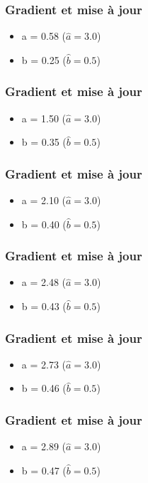 \documentclass{formation}
\begin{document}
\begin{frame}
  \frametitle{Gradient et mise à jour}
  \begin{itemize}
  \item a = 0.58 ($\hat{a} = 3.0$)
  \item b = 0.25 ($\hat{b} = 0.5$)
  \end{itemize}
\end{frame}

\begin{frame}
  \frametitle{Gradient et mise à jour}
  \begin{itemize}
  \item a = 1.50 ($\hat{a} = 3.0$)
  \item b = 0.35 ($\hat{b} = 0.5$)
  \end{itemize}
\end{frame}

\begin{frame}
  \frametitle{Gradient et mise à jour}
  \begin{itemize}
  \item a = 2.10 ($\hat{a} = 3.0$)
  \item b = 0.40 ($\hat{b} = 0.5$)
  \end{itemize}
\end{frame}

\begin{frame}
  \frametitle{Gradient et mise à jour}
  \begin{itemize}
  \item a = 2.48 ($\hat{a} = 3.0$)
  \item b = 0.43 ($\hat{b} = 0.5$)
  \end{itemize}
\end{frame}

\begin{frame}
  \frametitle{Gradient et mise à jour}
  \begin{itemize}
  \item a = 2.73 ($\hat{a} = 3.0$)
  \item b = 0.46 ($\hat{b} = 0.5$)
  \end{itemize}
\end{frame}

\begin{frame}
  \frametitle{Gradient et mise à jour}
  \begin{itemize}
  \item a = 2.89 ($\hat{a} = 3.0$)
  \item b = 0.47 ($\hat{b} = 0.5$)
  \end{itemize}
\end{frame}
\end{document}
